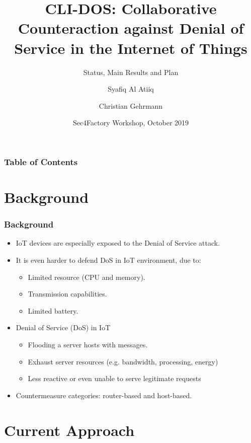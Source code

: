 \documentclass{beamer}
\title[CLI-DOS] %
{CLI-DOS: Collaborative Counteraction against Denial of Service in the Internet of Things}
\subtitle{Status, Main Results and Plan}
\author[Atiiq, Syafiq Al] %
{Syafiq Al Atiiq\inst{1} \and Christian Gehrmann\inst{1}}
\institute[LTH] %
{
  \inst{1}%
  Dept. of Electrical and Information Technology\\
  LTH Lund University
}
\date[WS 2019] %
{Sec4Factory Workshop, October 2019}
\begin{document}
\frame{\titlepage}


\begin{frame}
\frametitle{Table of Contents}
\tableofcontents
\end{frame}


\section{Background}

\begin{frame}
\frametitle{Background}

\begin{itemize}
    \item<1-> IoT devices are especially exposed to the Denial of Service attack.
    \item<2-> It is even harder to defend DoS in IoT environment, due to:
    \begin{itemize}
    \item Limited resource (CPU and memory).
    \item Transmission capabilities.
    \item Limited battery.
    \end{itemize}
    \item<3-> Denial of Service (DoS) in IoT
    \begin{itemize}
	\item Flooding a server hosts with messages.
	\item Exhaust server resources (e.g. bandwidth, processing, energy)
	\item Less reactive or even unable to serve legitimate requests    
    \end{itemize}
    \item<4-> Countermeasure categories: router-based and host-based.
\end{itemize}
\end{frame}


\section{Current Approach}
\end{document}
